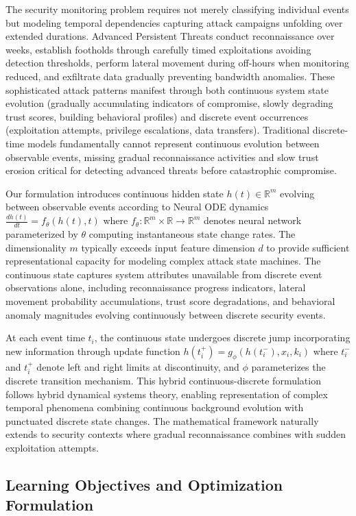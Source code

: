 \documentclass[10pt,journal,compsoc]{IEEEtran}
\newcommand{\R}{\mathbb{R}}
\begin{document}
The security monitoring problem requires not merely classifying individual events but modeling temporal dependencies capturing attack campaigns unfolding over extended durations. Advanced Persistent Threats conduct reconnaissance over weeks, establish footholds through carefully timed exploitations avoiding detection thresholds, perform lateral movement during off-hours when monitoring reduced, and exfiltrate data gradually preventing bandwidth anomalies. These sophisticated attack patterns manifest through both continuous system state evolution (gradually accumulating indicators of compromise, slowly degrading trust scores, building behavioral profiles) and discrete event occurrences (exploitation attempts, privilege escalations, data transfers). Traditional discrete-time models fundamentally cannot represent continuous evolution between observable events, missing gradual reconnaissance activities and slow trust erosion critical for detecting advanced threats before catastrophic compromise.

Our formulation introduces continuous hidden state $h(t) \in \R^m$ evolving between observable events according to Neural ODE dynamics $\frac{dh(t)}{dt} = f_\theta(h(t), t)$ where $f_\theta: \R^m \times \R \to \R^m$ denotes neural network parameterized by $\theta$ computing instantaneous state change rates. The dimensionality $m$ typically exceeds input feature dimension $d$ to provide sufficient representational capacity for modeling complex attack state machines. The continuous state captures system attributes unavailable from discrete event observations alone, including reconnaissance progress indicators, lateral movement probability accumulations, trust score degradations, and behavioral anomaly magnitudes evolving continuously between discrete security events.

At each event time $t_i$, the continuous state undergoes discrete jump incorporating new information through update function $h(t_i^+) = g_\phi(h(t_i^-), x_i, k_i)$ where $t_i^-$ and $t_i^+$ denote left and right limits at discontinuity, and $\phi$ parameterizes the discrete transition mechanism. This hybrid continuous-discrete formulation follows hybrid dynamical systems theory\cite{goebel2012hybrid}, enabling representation of complex temporal phenomena combining continuous background evolution with punctuated discrete state changes. The mathematical framework naturally extends to security contexts where gradual reconnaissance combines with sudden exploitation attempts.

\subsection{Learning Objectives and Optimization Formulation}
\end{document}
